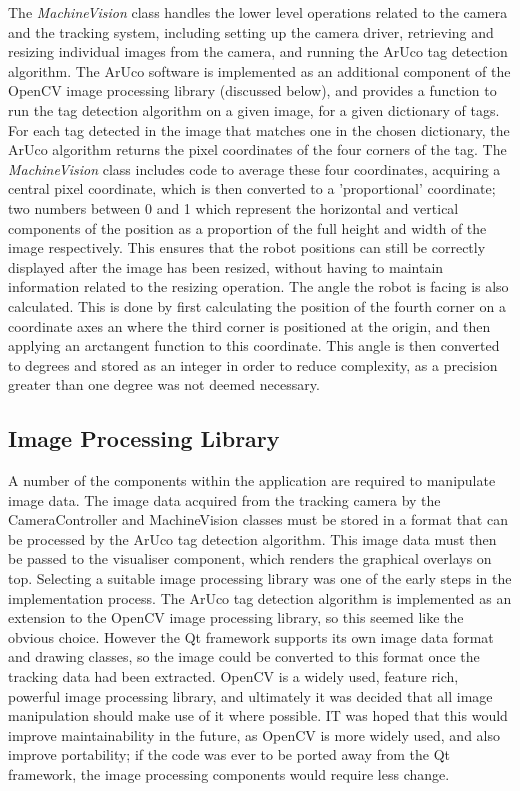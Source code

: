 The \textit{MachineVision} class handles the lower level operations related to the camera and the tracking system, including setting up the camera driver, retrieving and resizing individual images from the camera, and running the ArUco tag detection algorithm. The ArUco software is implemented as an additional component of the OpenCV image processing library (discussed below), and provides a function to run the tag detection algorithm on a given image, for a given dictionary of tags. For each tag detected in the image that matches one in the chosen dictionary, the ArUco algorithm returns the pixel coordinates of the four corners of the tag. The \textit{MachineVision} class includes code to average these four coordinates, acquiring a central pixel coordinate, which is then converted to a 'proportional' coordinate; two numbers between 0 and 1 which represent the horizontal and vertical components of the position as a proportion of the full height and width of the image respectively. This ensures that the robot positions can still be correctly displayed after the image has been resized, without having to maintain information related to the resizing operation. The angle the robot is facing is also calculated. This is done by first calculating the position of the fourth corner on a coordinate axes an where the third corner is positioned at the origin, and then applying an arctangent function to this coordinate. This angle is then converted to degrees and stored as an integer in order to reduce complexity, as a precision greater than one degree was not deemed necessary.


\subsection{Image Processing Library}
A number of the components within the application are required to manipulate image data. The image data acquired from the tracking camera by the CameraController and MachineVision classes must be stored in a format that can be processed by the ArUco tag detection algorithm. This image data must then be passed to the visualiser component, which renders the graphical overlays on top. Selecting a suitable image processing library was one of the early steps in the implementation process. The ArUco tag detection algorithm is implemented as an extension to the OpenCV image processing library, so this seemed like the obvious choice. However the Qt framework supports its own image data format and drawing classes, so the image could be converted to this format once the tracking data had been extracted. OpenCV is a widely used, feature rich, powerful image processing library, and ultimately it was decided that all image manipulation should make use of it where possible. IT was hoped that this would improve maintainability in the future, as OpenCV is more widely used, and also improve portability; if the code was ever to be ported away from the Qt framework, the image processing components would require less change.

